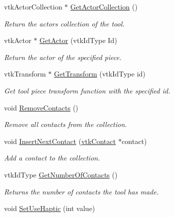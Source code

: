 \begin{DoxyCompactItemize}
vtkActorCollection $\ast$ \hyperlink{classvtkTool_a395a049fb5376df57590b96fc64d8092}{GetActorCollection} ()
\begin{DoxyCompactList}\small\item\em Return the actors collection of the tool. \item\end{DoxyCompactList}\item 
vtkActor $\ast$ \hyperlink{classvtkTool_a2e87421054997a9c6e69302516064dab}{GetActor} (vtkIdType Id)
\begin{DoxyCompactList}\small\item\em Return the actor of the specified piece. \item\end{DoxyCompactList}\item 
vtkTransform $\ast$ \hyperlink{classvtkTool_aa7c8e40f5216213e56cc7307bd16460a}{GetTransform} (vtkIdType id)
\begin{DoxyCompactList}\small\item\em Get tool piece transform function with the specified id. \item\end{DoxyCompactList}\item 
void \hyperlink{classvtkTool_a387cd53a14d1d40035f63a255eb57165}{RemoveContacts} ()
\begin{DoxyCompactList}\small\item\em Remove all contacts from the collection. \item\end{DoxyCompactList}\item 
void \hyperlink{classvtkTool_ae32bfdeb6ede9c25b0956fad8c15ba98}{InsertNextContact} (\hyperlink{classvtkContact}{vtkContact} $\ast$contact)
\begin{DoxyCompactList}\small\item\em Add a contact to the collection. \item\end{DoxyCompactList}\item 
vtkIdType \hyperlink{classvtkTool_a30d28cc8f7799ffac0527482c848f92a}{GetNumberOfContacts} ()
\begin{DoxyCompactList}\small\item\em Returns the number of contacts the tool has made. \item\end{DoxyCompactList}\item 
\hypertarget{classvtkTool_a769feb08ca71704f997ce8a18cb60ebd}{
void \hyperlink{classvtkTool_a769feb08ca71704f997ce8a18cb60ebd}{SetUseHaptic} (int value)}
\label{classvtkTool_a769feb08ca71704f997ce8a18cb60ebd}


\end{DoxyCompactItemize}
